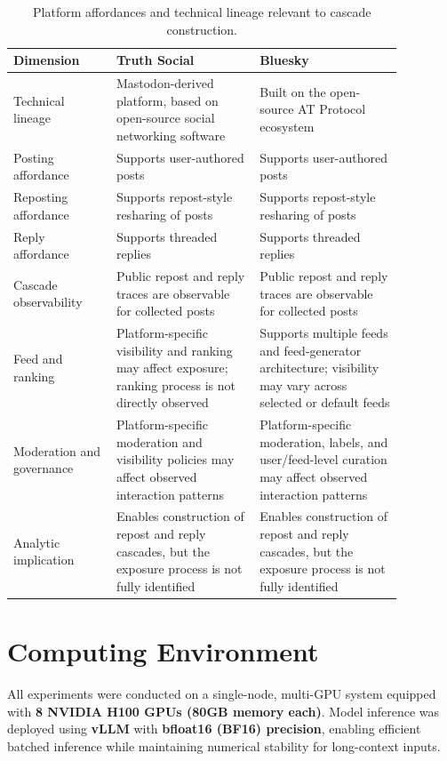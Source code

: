 \documentclass[letterpaper]{article} %
\begin{document}
\begin{table}[ht]
\centering
\small
\caption{Platform affordances and technical lineage relevant to cascade construction.}
\label{tab:platform_affordances}
\begin{tabular}{p{0.23\linewidth}p{0.32\linewidth}p{0.32\linewidth}}
\toprule
\textbf{Dimension} & \textbf{Truth Social} & \textbf{Bluesky} \\
\midrule
Technical lineage 
& Mastodon-derived platform, based on open-source social networking software 
& Built on the open-source AT Protocol ecosystem \\

Posting affordance 
& Supports user-authored posts 
& Supports user-authored posts \\

Reposting affordance 
& Supports repost-style resharing of posts 
& Supports repost-style resharing of posts \\

Reply affordance 
& Supports threaded replies 
& Supports threaded replies \\

Cascade observability 
& Public repost and reply traces are observable for collected posts 
& Public repost and reply traces are observable for collected posts \\

Feed and ranking 
& Platform-specific visibility and ranking may affect exposure; ranking process is not directly observed 
& Supports multiple feeds and feed-generator architecture; visibility may vary across selected or default feeds \\

Moderation and governance 
& Platform-specific moderation and visibility policies may affect observed interaction patterns 
& Platform-specific moderation, labels, and user/feed-level curation may affect observed interaction patterns \\

Analytic implication 
& Enables construction of repost and reply cascades, but the exposure process is not fully identified 
& Enables construction of repost and reply cascades, but the exposure process is not fully identified \\
\bottomrule
\end{tabular}
\end{table}

\section*{Computing Environment}

All experiments were conducted on a single-node, multi-GPU system equipped with \textbf{8 NVIDIA H100 GPUs (80GB memory each)}. Model inference was deployed using \textbf{vLLM} with \textbf{bfloat16 (BF16) precision}, enabling efficient batched inference while maintaining numerical stability for long-context inputs.
\end{document}
